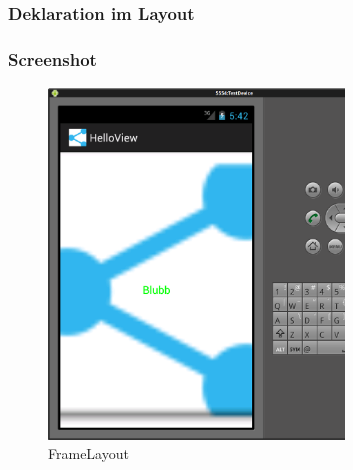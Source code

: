 \begin{frame}
   \frametitle{Deklaration im Layout}
   
\end{frame}

\begin{frame}
   \frametitle{Screenshot}
   \begin{figure}[h!]
     \centering
     \includegraphics[width=0.7\textwidth]{pictures/frame_layout.ps}
     \caption{
        FrameLayout
     }
     \label{fig:frame_layout}
   \end{figure}
\end{frame}

